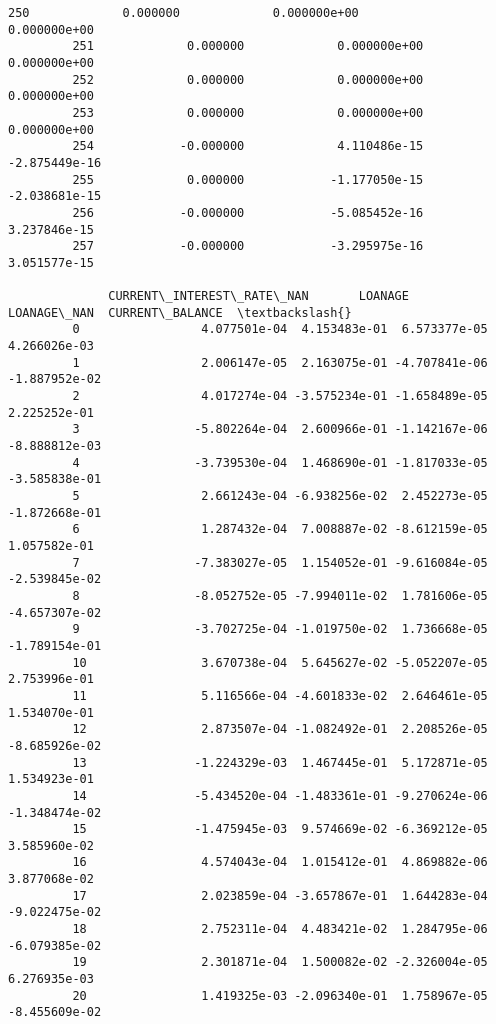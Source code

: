 \documentclass[11pt]{article}
\begin{document}
\begin{Verbatim}[commandchars=\\\{\}]
         250             0.000000             0.000000e+00           0.000000e+00   
         251             0.000000             0.000000e+00           0.000000e+00   
         252             0.000000             0.000000e+00           0.000000e+00   
         253             0.000000             0.000000e+00           0.000000e+00   
         254            -0.000000             4.110486e-15          -2.875449e-16   
         255             0.000000            -1.177050e-15          -2.038681e-15   
         256            -0.000000            -5.085452e-16           3.237846e-15   
         257            -0.000000            -3.295975e-16           3.051577e-15   
         
              CURRENT\_INTEREST\_RATE\_NAN       LOANAGE   LOANAGE\_NAN  CURRENT\_BALANCE  \textbackslash{}
         0                 4.077501e-04  4.153483e-01  6.573377e-05     4.266026e-03   
         1                 2.006147e-05  2.163075e-01 -4.707841e-06    -1.887952e-02   
         2                 4.017274e-04 -3.575234e-01 -1.658489e-05     2.225252e-01   
         3                -5.802264e-04  2.600966e-01 -1.142167e-06    -8.888812e-03   
         4                -3.739530e-04  1.468690e-01 -1.817033e-05    -3.585838e-01   
         5                 2.661243e-04 -6.938256e-02  2.452273e-05    -1.872668e-01   
         6                 1.287432e-04  7.008887e-02 -8.612159e-05     1.057582e-01   
         7                -7.383027e-05  1.154052e-01 -9.616084e-05    -2.539845e-02   
         8                -8.052752e-05 -7.994011e-02  1.781606e-05    -4.657307e-02   
         9                -3.702725e-04 -1.019750e-02  1.736668e-05    -1.789154e-01   
         10                3.670738e-04  5.645627e-02 -5.052207e-05     2.753996e-01   
         11                5.116566e-04 -4.601833e-02  2.646461e-05     1.534070e-01   
         12                2.873507e-04 -1.082492e-01  2.208526e-05    -8.685926e-02   
         13               -1.224329e-03  1.467445e-01  5.172871e-05     1.534923e-01   
         14               -5.434520e-04 -1.483361e-01 -9.270624e-06    -1.348474e-02   
         15               -1.475945e-03  9.574669e-02 -6.369212e-05     3.585960e-02   
         16                4.574043e-04  1.015412e-01  4.869882e-06     3.877068e-02   
         17                2.023859e-04 -3.657867e-01  1.644283e-04    -9.022475e-02   
         18                2.752311e-04  4.483421e-02  1.284795e-06    -6.079385e-02   
         19                2.301871e-04  1.500082e-02 -2.326004e-05     6.276935e-03   
         20                1.419325e-03 -2.096340e-01  1.758967e-05    -8.455609e-02   

\end{Verbatim}
\end{document}
